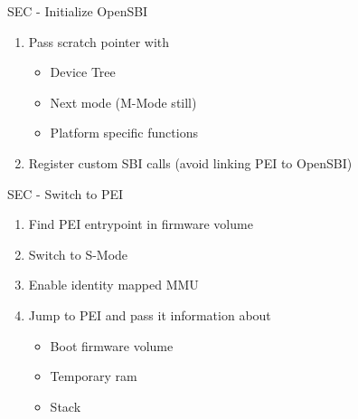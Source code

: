 \documentclass[
  10pt
]{beamer}
\begin{document}
\begin{frame}{SEC - Initialize OpenSBI}
  \begin{enumerate}
    \item Pass scratch pointer with
    \begin{itemize}
      \item Device Tree %
      \item Next mode (M-Mode still)
      \item Platform specific functions
    \end{itemize}
    \item Register custom SBI calls (avoid linking PEI to OpenSBI)
  \end{enumerate}
\end{frame}

\begin{frame}{SEC - Switch to PEI}
  \begin{enumerate} %
    \item Find PEI entrypoint in firmware volume
    \item Switch to S-Mode
    \item Enable identity mapped MMU
    \item Jump to PEI and pass it information about
    \begin{itemize}
      \item Boot firmware volume
      \item Temporary ram
      \item Stack
    \end{itemize}
  \end{enumerate}
\end{frame}
\end{document}
